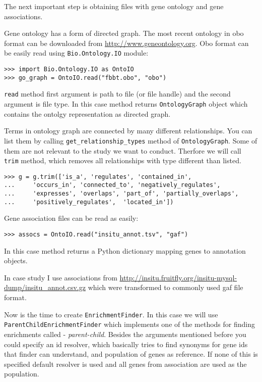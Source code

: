 The next important step is obtaining files with gene ontology and gene
associations.

Gene ontology has a form of directed graph.
The most recent ontology in obo format can be downloaded from
\url{http://www.geneontology.org}. Obo format can be easily read using
\verb|Bio.Ontology.IO| module:

\begin{verbatim}
>>> import Bio.Ontology.IO as OntoIO
>>> go_graph = OntoIO.read("fbbt.obo", "obo")
\end{verbatim}

\verb|read| method first argument is path to file (or file handle) and the
second argument is file type. In this case method returns \verb|OntologyGraph|
object which contains the ontolgy representation as directed graph.

Terms in ontology graph are connected by many different relationships. You can
list them by calling \verb|get_relationship_types| method of \verb|OntologyGraph|.
Some of them are not relevant to the study we want to conduct. Therfore we will
call \verb|trim| method, which removes all relationships with type different
than listed.

\begin{verbatim}
>>> g = g.trim(['is_a', 'regulates', 'contained_in',
...     'occurs_in', 'connected_to', 'negatively_regulates',
...     'expresses', 'overlaps', 'part_of', 'partially_overlaps',
...     'positively_regulates',  'located_in'])
\end{verbatim}

Gene association files can be read as easily:

\begin{verbatim}
>>> assocs = OntoIO.read("insitu_annot.tsv", "gaf")
\end{verbatim}


In this case method returns a Python dictionary mapping genes to
annotation objects.

In case study I use associations from \url{http://insitu.fruitfly.org/insitu-mysql-dump/insitu_annot.csv.gz}
which were transformed to commonly used gaf file format.

Now is the time to create \verb|EnrichmentFinder|. In this case we will
use \verb|ParentChildEnrichmentFinder| which implements one of the methods
for finding enrichments called - \emph{parent-child}. Besides the arguments
mentioned before you could specify an id resolver, which basically tries
to find synonyms for gene ids that finder can understand, and population
of genes as reference. If none of this is specified default resolver
is used and all genes from association are used as the population.

